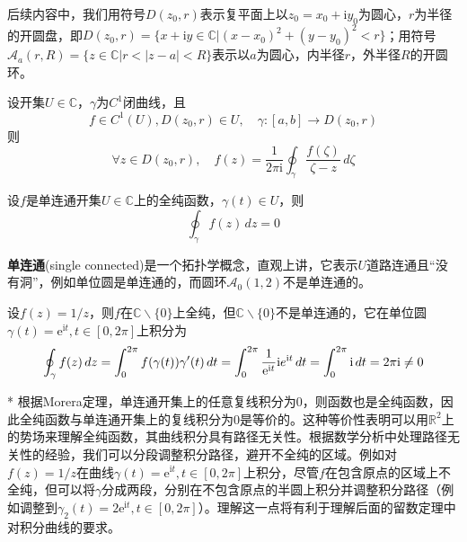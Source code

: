 后续内容中，我们用符号$D(z_0,r)$表示复平面上以$z_0=x_0+\mathrm{i}y_0$为圆心，$r$为半径的开圆盘，即$D(z_0,r)=\{x+\mathrm{i}y\in\mathbb{C}\big| (x-x_0)^2+(y-y_0)^2<r\}$；用符号$\mathcal{A} _a(r,R)=\{z\in\mathbb{C}|r<|z-a|<R\}$表示以$a$为圆心，内半径$r$，外半径$R$的开圆环。
\begin{theorem}[柯西积分公式]
    设开集$U\in\mathbb{C}$，$\gamma$为$C^1$闭曲线，且$$f\in C^1(U),D(z_0,r)\in U,\quad\gamma:[a,b]\to D(z_0,r)$$则
    \[\forall z\in D(z_0,r),\quad f(z)=\frac{1}{2\pi \mathrm{i}}\oint_{\gamma}\frac{f(\zeta)}{\zeta-z}\,d\zeta\]
\end{theorem}
\begin{theorem}[柯西积分定理]
    设$f$是单连通开集$U\in\mathbb{C}$上的全纯函数，$\gamma(t)\in U$，则
    \[\oint_{\gamma}f(z)\,dz=0\]
\end{theorem}
\begin{remark}
    \textbf{单连通}(single connected)是一个拓扑学概念，直观上讲，它表示$U$道路连通且“没有洞”，例如单位圆是单连通的，而圆环$\mathcal{A}_0(1,2)$不是单连通的。
\end{remark}
\begin{example}
设$f(z)=1/z$，则$f$在$\mathbb{C}\backslash\{0\}$上全纯，但$\mathbb{C}\backslash\{0\}$不是单连通的，它在单位圆$\gamma(t)=\mathrm{e}^{\mathrm{i}t},t\in[0,2\pi]$上积分为\begin{align*}
    \oint_{\gamma}f(z)\,dz=\int_0^{2\pi}f(\gamma(t))\gamma'(t)\,dt=\int_0^{2\pi}\frac{1}{\mathrm{e}^{\mathrm{i}t}}\mathrm{i}e^{\mathrm{i} t}\,dt=\int_0^{2\pi}\mathrm{i}\,dt=2\pi \mathrm{i}\neq 0
\end{align*}
\end{example}

\begin{remark}*
    根据Morera定理，单连通开集上的任意复线积分为0，则函数也是全纯函数，因此全纯函数与单连通开集上的复线积分为0是等价的。这种等价性表明可以用$\mathbb{R}^2$上的势场来理解全纯函数，其曲线积分具有路径无关性。根据数学分析中处理路径无关性的经验，我们可以分段调整积分路径，避开不全纯的区域。例如对$f(z)=1/z$在曲线$\gamma(t)=\mathrm{e}^{\mathrm{i}t},t\in[0,2\pi]$上积分，尽管$f$在包含原点的区域上不全纯，但可以将$\gamma$分成两段，分别在不包含原点的半圆上积分并调整积分路径（例如调整到$\gamma_2(t)=2\mathrm{e}^{\mathrm{i}t},t\in[0,2\pi]$）。理解这一点将有利于理解后面的留数定理中对积分曲线的要求。
\end{remark}

